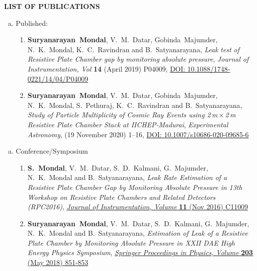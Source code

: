 \documentclass[12pt]{article}
\begin{document}
\pagebreak
\vspace{0.4cm}
\colorbox{gray!40}{\begin{minipage}{17.5cm}
\bf {LIST OF PUBLICATIONS} 
\end{minipage} }
\begin{minipage}{1.05\textwidth}
  
  \vspace{0.4cm}
  \begin{enumerate}[a.]
  \item Published:
    
    \begin{enumerate}[1.]
    \item {\bf Suryanarayan~Mondal}, V.~M.~Datar, Gobinda~Majumder, N.~K.~Mondal, K.~C.~Ravindran and B.~Satyanarayana, \emph{Leak test of Resistive Plate Chamber gap by monitoring absolute pressure}, \emph{Journal of Instrumentation, Vol} \textbf{14} (April 2019) P04009, \href{https://doi.org/10.1088/1748-0221/14/04/P04009}{DOI: 10.1088/1748-0221/14/04/P04009}
    \item {\bf Suryanarayan~Mondal}, V.~M.~Datar, Gobinda~Majumder, N.~K.~Mondal, S.~Pethuraj, K.~C.~Ravindran and B.~Satyanarayana, \emph{Study of Particle Multiplicity of Cosmic Ray Events using 2\,m\,$\times$\,2\,m Resistive Plate Chamber Stack at IICHEP-Madurai}, \emph{Experimental Astronomy}, (19 November 2020) 1--16, \href{https://doi.org/10.1007/s10686-020-09685-6}{DOI: 10.1007/s10686-020-09685-6}
    \end{enumerate} 
  \end{enumerate} 
  \begin{enumerate}[b.]
  \item Conference/Symposium
    \begin{enumerate}[1.]
    \item {\bf S.~Mondal}, V.~M.~Datar, S.~D.~Kalmani, G.~Majumder, N.~K.~Mondal and B.~Satyanarayana, \emph{Leak Rate Estimation of a Resistive Plate Chamber Gap by Monitoring Absolute Pressure in 13th Workshop on Resistive Plate Chambers and Related Detectors (RPC2016)}, \href{https://doi.org/10.1088/1748-0221/11/11/C11009}{\emph{Journal of Instrumentation, Volume } \textbf{11} (Nov 2016) C11009}
    \item {\bf Suryanarayan~Mondal}, V.~M.~Datar, S.~D.~Kalmani, G.~Majumder, N.~K.~Mondal and B.~Satyanarayana, \emph{Estimation of Leak of a Resistive Plate Chamber by Monitoring Absolute Pressure in XXII DAE High Energy Physics Symposium}, \href{https://doi.org/10.1007/978-3-319-73171-1_207}{\emph{Springer Proceedings in Physics, Volume } \textbf{203} (May 2018) 851-853}

\end{enumerate}
\end{enumerate}
\end{minipage}
\end{document}
